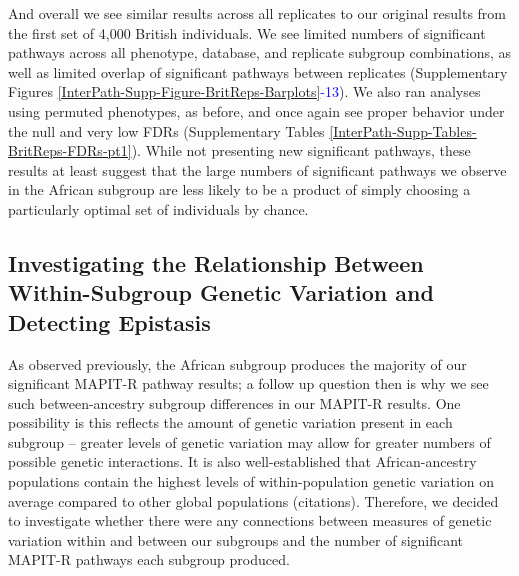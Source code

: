 \documentclass[12pt,a4paper]{article}
\begin{document}
And overall we see similar results across all replicates to our original results from the first set of 4,000 British individuals. We see limited numbers of significant pathways across all phenotype, database, and replicate subgroup combinations, as well as limited overlap of significant pathways between replicates (Supplementary Figures \ref{InterPath-Supp-Figure-BritReps-Barplots}\textcolor{blue}{-13}). We also ran analyses using permuted phenotypes, as before, and once again see proper behavior under the null and very low FDRs (Supplementary Tables \ref{InterPath-Supp-Tables-BritReps-FDRs-pt1}). While not presenting new significant pathways, these results at least suggest that the large numbers of significant pathways we observe in the African subgroup are less likely to be a product of simply choosing a particularly optimal set of individuals by chance.  






\subsection{Investigating the Relationship Between Within-Subgroup Genetic Variation and Detecting Epistasis}

As observed previously, the African subgroup produces the majority of our significant MAPIT-R pathway results; a follow up question then is why we see such between-ancestry subgroup differences in our MAPIT-R results. One possibility is this reflects the amount of genetic variation present in each subgroup -- greater levels of genetic variation may allow for greater numbers of possible genetic interactions. It is also well-established that African-ancestry populations contain the highest levels of within-population genetic variation on average compared to other global populations (citations). Therefore, we decided to investigate whether there were any connections between measures of genetic variation within and between our subgroups and the number of significant MAPIT-R pathways each subgroup produced.
\end{document}

